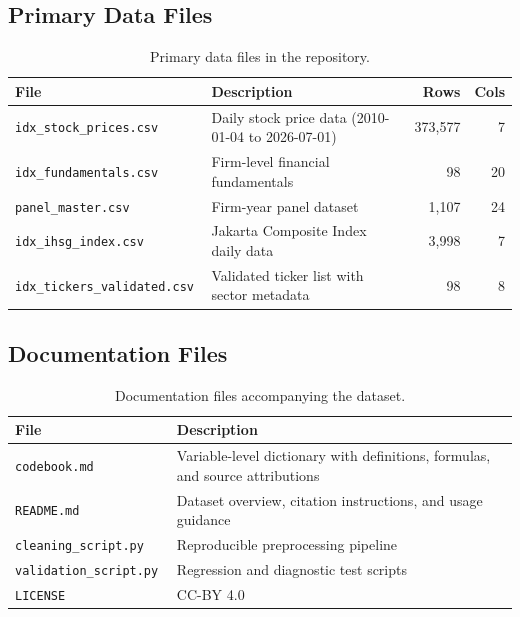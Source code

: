 \documentclass[11pt,a4paper]{article}
\begin{document}
\subsection{Primary Data Files}

\begin{table}[H]
\centering
\caption{Primary data files in the repository.}
\label{tab:datafiles}
\begin{tabular}{l p{5.5cm} r r}
\toprule
\textbf{File} & \textbf{Description} & \textbf{Rows} & \textbf{Cols} \\
\midrule
\tt idx\_stock\_prices.csv & Daily stock price data (2010-01-04 to 2026-07-01) & 373{,}577 & 7 \\
\tt idx\_fundamentals.csv & Firm-level financial fundamentals & 98 & 20 \\
\tt panel\_master.csv      & Firm-year panel dataset              & 1{,}107 & 24 \\
\tt idx\_ihsg\_index.csv    & Jakarta Composite Index daily data   & 3{,}998 & 7 \\
\tt idx\_tickers\_validated.csv & Validated ticker list with sector metadata & 98 & 8 \\
\bottomrule
\end{tabular}
\end{table}

\subsection{Documentation Files}

\begin{table}[H]
\centering
\caption{Documentation files accompanying the dataset.}
\label{tab:docfiles}
\begin{tabular}{l p{10cm}}
\toprule
\textbf{File} & \textbf{Description} \\
\midrule
\tt codebook.md       & Variable-level dictionary with definitions, formulas, and source attributions \\
\tt README.md         & Dataset overview, citation instructions, and usage guidance \\
\tt cleaning\_script.py  & Reproducible preprocessing pipeline \\
\tt validation\_script.py & Regression and diagnostic test scripts \\
\tt LICENSE           & CC-BY 4.0 \\
\bottomrule
\end{tabular}
\end{table}
\end{document}
